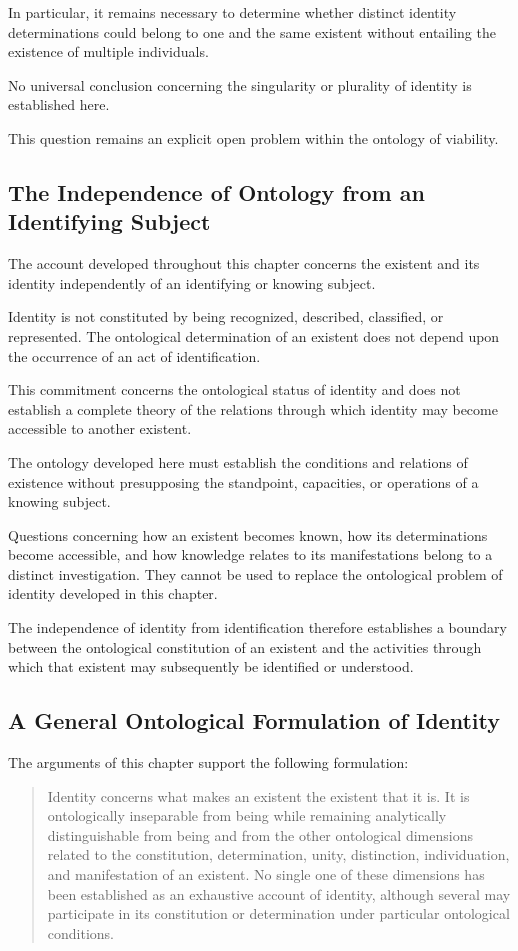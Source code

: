 In particular, it remains necessary to determine
whether distinct identity determinations could
belong to one and the same existent without
entailing the existence of multiple individuals.

No universal conclusion concerning the singularity
or plurality of identity is established here.

This question remains an explicit open problem
within the ontology of viability.

\subsection{The Independence of Ontology from an Identifying Subject}

The account developed throughout this chapter
concerns the existent and its identity independently
of an identifying or knowing subject.

Identity is not constituted by being recognized,
described, classified, or represented. The
ontological determination of an existent does
not depend upon the occurrence of an act of
identification.

This commitment concerns the ontological status
of identity and does not establish a complete
theory of the relations through which identity
may become accessible to another existent.

The ontology developed here must establish the
conditions and relations of existence without
presupposing the standpoint, capacities, or
operations of a knowing subject.

Questions concerning how an existent becomes
known, how its determinations become accessible,
and how knowledge relates to its manifestations
belong to a distinct investigation. They cannot
be used to replace the ontological problem of
identity developed in this chapter.

The independence of identity from identification
therefore establishes a boundary between the
ontological constitution of an existent and
the activities through which that existent
may subsequently be identified or understood.

\subsection{A General Ontological Formulation of Identity}

The arguments of this chapter support the
following formulation:

\begin{quote}
Identity concerns what makes an existent the
existent that it is. It is ontologically
inseparable from being while remaining analytically
distinguishable from being and from the other
ontological dimensions related to the constitution,
determination, unity, distinction, individuation,
and manifestation of an existent. No single one
of these dimensions has been established as an
exhaustive account of identity, although several
may participate in its constitution or
determination under particular ontological
conditions.
\end{quote}

